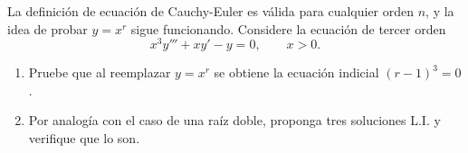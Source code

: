 \begin{exercise}
    La definici\'on de ecuaci\'on de Cauchy-Euler es v\'alida para cualquier orden $n$, y la idea de probar $y=x^r$ sigue funcionando. Considere la ecuaci\'on de tercer orden
    \[
    x^3y'''+xy'-y=0,\qquad x>0.
    \]
    \begin{enumerate}[label=\alph*)]
        \item Pruebe que al reemplazar $y=x^r$ se obtiene la ecuaci\'on indicial $(r-1)^3=0$.
        \item Por analog\'ia con el caso de una ra\'iz doble, proponga tres soluciones L.I. y verifique que lo son.
    \end{enumerate}
\end{exercise}
